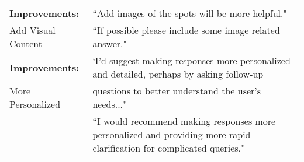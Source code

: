\begin{table*}[t]
\begin{tabular}{l|p{11.3cm}}
\textbf{Improvements:} & ``Add images of the spots will be more helpful." \\  
Add Visual Content & ``If possible please include some image related answer." \\ \hline
\textbf{Improvements:} & `I’d suggest making responses more personalized and detailed, perhaps by asking follow-up \\
More Personalized & questions to better understand the user’s needs..."\\
& ``I would recommend making responses more personalized and providing more rapid clarification for complicated queries." \\ 
 \bottomrule
    \end{tabular}
\end{table*}